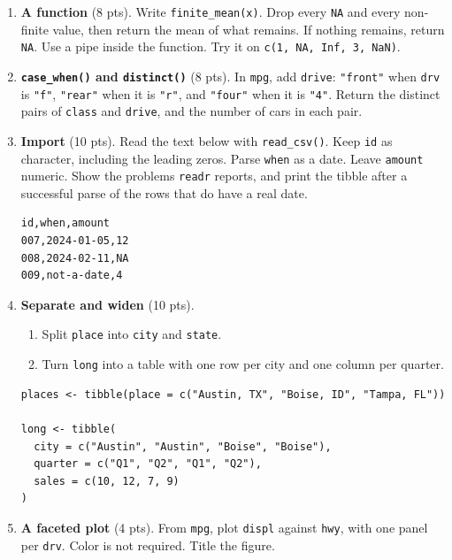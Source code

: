 \documentclass[11pt]{article}
\begin{document}
\begin{enumerate}
\item \textbf{A function} (8 pts).
Write \texttt{finite\_mean(x)}. Drop every \texttt{NA} and every
non-finite value, then return the mean of what remains.
If nothing remains, return \texttt{NA}.
Use a pipe inside the function.
Try it on \texttt{c(1, NA, Inf, 3, NaN)}.

\item \textbf{\texttt{case\_when()} and \texttt{distinct()}} (8 pts).
In \texttt{mpg}, add \texttt{drive}: \texttt{"front"} when
\texttt{drv} is \texttt{"f"}, \texttt{"rear"} when it is \texttt{"r"},
and \texttt{"four"} when it is \texttt{"4"}.
Return the distinct pairs of \texttt{class} and \texttt{drive}, and
the number of cars in each pair.

\item \textbf{Import} (10 pts).
Read the text below with \texttt{read\_csv()}.
Keep \texttt{id} as character, including the leading zeros.
Parse \texttt{when} as a date. Leave \texttt{amount} numeric.
Show the problems \texttt{readr} reports, and print the tibble
after a successful parse of the rows that do have a real date.

\begin{lstlisting}
id,when,amount
007,2024-01-05,12
008,2024-02-11,NA
009,not-a-date,4
\end{lstlisting}

\item \textbf{Separate and widen} (10 pts).

\begin{enumerate}
\item Split \texttt{place} into \texttt{city} and \texttt{state}.
\item Turn \texttt{long} into a table with one row per city and one
column per quarter.
\end{enumerate}

\begin{lstlisting}
places <- tibble(place = c("Austin, TX", "Boise, ID", "Tampa, FL"))

long <- tibble(
  city = c("Austin", "Austin", "Boise", "Boise"),
  quarter = c("Q1", "Q2", "Q1", "Q2"),
  sales = c(10, 12, 7, 9)
)
\end{lstlisting}

\item \textbf{A faceted plot} (4 pts).
From \texttt{mpg}, plot \texttt{displ} against \texttt{hwy},
with one panel per \texttt{drv}. Color is not required.
Title the figure.
\end{enumerate}
\end{document}
